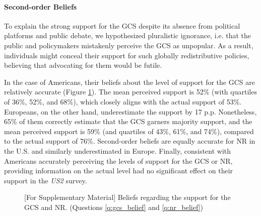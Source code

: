 \begin{tcolorbox}\label{subsec:second_order_beliefs}
  \paragraph{Second-order Beliefs}
To explain the strong support for the GCS despite its absence from political platforms and public debate, we hypothesized pluralistic ignorance, i.e. that the public and policymakers mistakenly perceive the GCS as unpopular. As a result, individuals might conceal their support for such globally redistributive policies, believing that advocating for them would be futile. 

In the case of Americans, their beliefs about the level of support for the GCS are relatively accurate (Figure \ref{fig:belief}). The mean perceived support is 52\% (with quartiles of 36\%, 52\%, and 68\%), which closely aligns with the actual support of 53\%. Europeans, on the other hand, underestimate the support by 17 p.p. Nonetheless, 65\% of them correctly estimate that the GCS garners majority support, and the mean perceived support is 59\% (and quartiles of 43\%, 61\%, and 74\%), compared to the actual support of 76\%. Second-order beliefs are equally accurate for NR in the U.S. and similarly underestimated in Europe. %
Finally, consistent with Americans accurately perceiving the levels of support for the GCS or NR, providing information on the actual level had no significant effect on their support in the \textit{US2} survey. %
\end{tcolorbox}

\begin{figure}[h!]
    \caption[Beliefs about support for the GCS and NR]{[For Supplementary Material] Beliefs regarding the support for the GCS and NR. (Questions \ref{q:gcs_belief} and \ref{q:nr_belief})}\label{fig:belief}
\end{figure}

